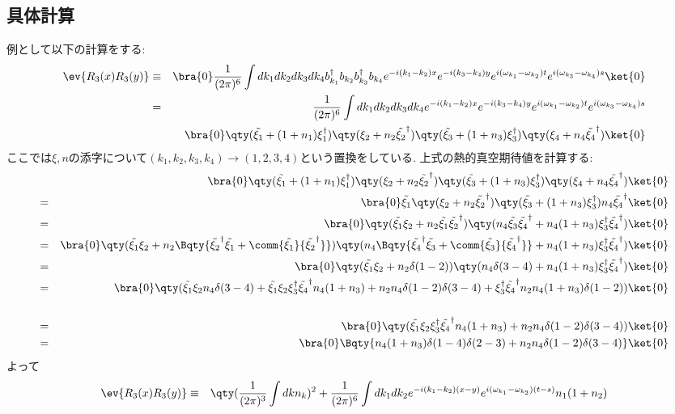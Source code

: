 \documentclass[10.5pt,a4paper]{jreport}
\begin{document}
\subsection{具体計算}
例として以下の計算をする:
\begin{eqnarray}
  \ev{R_3(x)R_3(y)} &\equiv& \bra{0}\frac{1}{(2\pi)^6}\int dk_1dk_2dk_3dk_4 b^\dagger_{k_1}b_{k_2}b^\dagger_{k_3}b_{k_4}e^{-i(k_1-k_2)x}e^{-i(k_3-k_4)y}e^{i(\omega_{k_1}-\omega_{k_2})t}e^{i(\omega_{k_3}-\omega_{k_4})s}\ket{0}\\
  \nonumber  &=& \frac{1}{(2\pi)^6}\int dk_1dk_2dk_3dk_4e^{-i(k_1-k_2)x}e^{-i(k_3-k_4)y}e^{i(\omega_{k_1}-\omega_{k_2})t}e^{i(\omega_{k_3}-\omega_{k_4})s}\\
  && \bra{0}\qty(\tilde{\xi_1} + (1+n_1)\xi_1^\dagger)\qty(\xi_2 + n_2\tilde{\xi_2}^\dagger)\qty(\tilde{\xi_3} + (1+n_3)\xi_3^\dagger)\qty(\xi_4 + n_4\tilde{\xi_4}^\dagger)\ket{0}
\end{eqnarray}
ここでは$\xi, n$の添字について$(k_1, k_2, k_3, k_4)\rightarrow(1, 2, 3, 4)$という置換をしている. 上式の熱的真空期待値を計算する:
\begin{eqnarray}
  &&\bra{0}\qty(\tilde{\xi_1} + (1+n_1)\xi_1^\dagger)\qty(\xi_2 + n_2\tilde{\xi_2}^\dagger)\qty(\tilde{\xi_3} + (1+n_3)\xi_3^\dagger)\qty(\xi_4 + n_4\tilde{\xi_4}^\dagger)\ket{0}\\
  =&&\bra{0}\tilde{\xi_1}\qty(\xi_2 + n_2\tilde{\xi_2}^\dagger)\qty(\tilde{\xi_3} + (1+n_3)\xi_3^\dagger)n_4\tilde{\xi_4}^\dagger\ket{0}\\
  =&&\bra{0}\qty(\tilde{\xi_1}\xi_2 + n_2\tilde{\xi_1}\tilde{\xi_2}^\dagger)\qty(n_4\tilde{\xi_3}\tilde{\xi_4}^\dagger + n_4(1+n_3)\xi_3^\dagger \tilde{\xi_4}^\dagger)\ket{0}\\
  =&&\bra{0}\qty(\tilde{\xi_1}\xi_2 + n_2\Bqty{\tilde{\xi_2}^\dagger\tilde{\xi_1} + \comm{\tilde{\xi_1}}{\tilde{\xi_2}^\dagger}})\qty(n_4\Bqty{\tilde{\xi_4}^\dagger\tilde{\xi_3} + \comm{\tilde{\xi_3}}{\tilde{\xi_4}^\dagger}} + n_4(1+n_3)\xi_3^\dagger \tilde{\xi_4}^\dagger)\ket{0}\\
  =&&\bra{0}\qty(\tilde{\xi_1}\xi_2 + n_2\delta(1-2))\qty(n_4\delta(3-4) + n_4(1+n_3)\xi_3^\dagger \tilde{\xi_4}^\dagger)\ket{0}\\
  \nonumber  = &&\bra{0}\qty(\tilde{\xi_1}\xi_2n_4\delta(3-4) + \tilde{\xi_1}\xi_2\xi_3^\dagger \tilde{\xi_4}^\dagger n_4(1+n_3) + n_2n_4\delta(1-2)\delta(3-4) + \xi_3^\dagger \tilde{\xi_4}^\dagger n_2n_4(1+n_3)\delta(1-2))\ket{0}\\
  \\
  = &&\bra{0}\qty(\tilde{\xi_1}\xi_2\xi_3^\dagger \tilde{\xi_4}^\dagger n_4(1+n_3) + n_2n_4\delta(1-2)\delta(3-4))\ket{0}\\
  = &&\bra{0}\Bqty{n_4(1+n_3)\delta(1-4)\delta(2-3) + n_2n_4\delta(1-2)\delta(3-4)}\ket{0}
\end{eqnarray}
よって
\begin{eqnarray}
  \nonumber  \ev{R_3(x)R_3(y)} &\equiv&\qty(\frac{1}{(2\pi)^3}\int dk n_k)^2 + \frac{1}{(2\pi)^6}\int dk_1dk_2 e^{-i(k_1-k_2)(x-y)}e^{i(\omega_{k_1}-\omega_{k_2})(t-s)}n_1(1+n_2)\label{expectation2}\\
\end{eqnarray}
\end{document}
